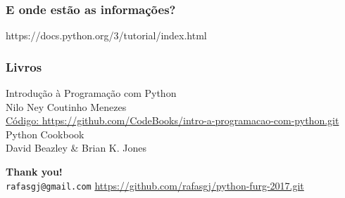 \documentclass[aspectratio=169,14pt]{beamer}
\begin{document}
\begin{frame}
    \frametitle{E onde estão as informações?}
    \centering \Large https://docs.python.org/3/tutorial/index.html
\end{frame}

\begin{frame}
    \frametitle{Livros}
    \vfill
    \large Introdução à Programação com Python \\ \normalsize
    Nilo Ney Coutinho Menezes \\
    \hfill\footnotesize\href{https://github.com/CodeBooks/intro-a-programacao-com-python.git}{Código: \url{https://github.com/CodeBooks/intro-a-programacao-com-python.git}}
    \vfill
    \large Python Cookbook \\ \normalsize
    David Beazley \& Brian K. Jones
    \vfill
\end{frame}

\begin{frame}
    \begin{flushright}
    \huge \textbf{Thank you!} \\
    \vfill
    \small \texttt{rafasgj@gmail.com}
    \vfill
    \small \href{https://github.com/rafasgj/python-furg-2017.git}{\url{https://github.com/rafasgj/python-furg-2017.git}}
    \end{flushright}
\end{frame}
\end{document}
